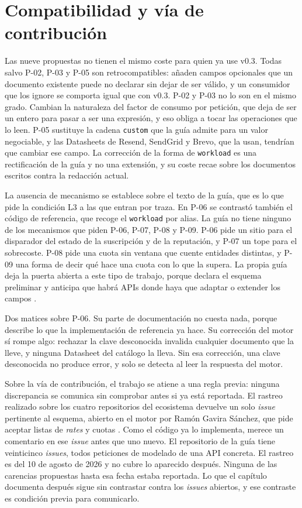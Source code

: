 \section{Compatibilidad y vía de contribución}
\label{sec:evolucion:compatibilidad}

Las nueve propuestas no tienen el mismo coste para quien ya use v0.3.
Todas salvo P-02, P-03 y P-05 son retrocompatibles: añaden campos opcionales que un documento existente puede no declarar sin dejar de ser válido, y un consumidor que los ignore se comporta igual que con v0.3.
P-02 y P-03 no lo son en el mismo grado.
Cambian la naturaleza del factor de consumo por petición, que deja de ser un entero para pasar a ser una expresión, y eso obliga a tocar las operaciones que lo leen.
P-05 sustituye la cadena \texttt{custom} que la guía admite para un valor negociable, y las Datasheets de Resend, SendGrid y Brevo, que la usan, tendrían que cambiar ese campo.
La corrección de la forma de \texttt{workload} es una rectificación de la guía y no una extensión, y su coste recae sobre los documentos escritos contra la redacción actual.

La ausencia de mecanismo se establece sobre el texto de la guía, que es lo que pide la condición L3 a las que entran por traza.
En P-06 se contrastó también el código de referencia, que recoge el \texttt{workload} por alias.
La guía no tiene ninguno de los mecanismos que piden P-06, P-07, P-08 y P-09.
P-06 pide un sitio para el disparador del estado de la suscripción y de la reputación, y P-07 un tope para el sobrecoste.
P-08 pide una cuota sin ventana que cuente entidades distintas, y P-09 una forma de decir qué hace una cuota con lo que la supera.
La propia guía deja la puerta abierta a este tipo de trabajo, porque declara el esquema preliminar y anticipa que habrá APIs donde haya que adaptar o extender los campos \citep{apisconsumptionmodel}.

Dos matices sobre P-06.
Su parte de documentación no cuesta nada, porque describe lo que la implementación de referencia ya hace.
Su corrección del motor sí rompe algo: rechazar la clave desconocida invalida cualquier documento que la lleve, y ninguna Datasheet del catálogo la lleva.
Sin esa corrección, una clave desconocida no produce error, y solo se detecta al leer la respuesta del motor.

Sobre la vía de contribución, el trabajo se atiene a una regla previa: ninguna discrepancia se comunica sin comprobar antes si ya está reportada.
El rastreo realizado sobre los cuatro repositorios del ecosistema devuelve un solo \textit{issue} pertinente al esquema, abierto en el motor por Ramón Gavira Sánchez, que pide aceptar listas de \textit{rates} y cuotas \citep{prime4apirepo}.
Como el código ya lo implementa, merece un comentario en ese \textit{issue} antes que uno nuevo.
El repositorio de la guía tiene veinticinco \textit{issues}, todos peticiones de modelado de una API concreta.
El rastreo es del 10 de agosto de 2026 y no cubre lo aparecido después.
Ninguna de las carencias propuestas hasta esa fecha estaba reportada.
Lo que el capítulo documenta después sigue sin contrastar contra los \textit{issues} abiertos, y ese contraste es condición previa para comunicarlo.

